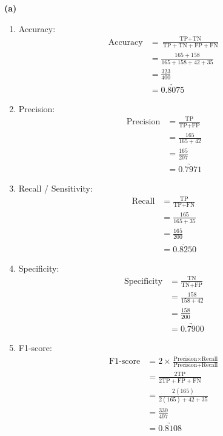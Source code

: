 \textbf{(a)}
\begin{enumerate}[label=\roman*., topsep=0pt, itemsep=2pt]
    \item Accuracy:
        \begin{align*}
        \text{Accuracy} &= \frac{\text{TP} + \text{TN}}{\text{TP} + \text{TN} + \text{FP} + \text{FN}} \\
                        &= \frac{165 + 158}{165 + 158 + 42 + 35} \\
                        &= \frac{323}{400} \\
                        &= \underrightarrow{0.8075}
        \end{align*}
    \item Precision:
        \begin{align*}
        \text{Precision} &= \frac{\text{TP}}{\text{TP} + \text{FP}} \\
                         &= \frac{165}{165 + 42} \\
                         &= \frac{165}{207} \\
                         &= \underrightarrow{0.7971}
        \end{align*}
    \item Recall / Sensitivity:
        \begin{align*}
        \text{Recall}   &= \frac{\text{TP}}{\text{TP} + \text{FN}} \\
                        &= \frac{165}{165 + 35} \\
                        &= \frac{165}{200} \\
                        &= \underrightarrow{0.8250}
        \end{align*}
    \item Specificity:
        \begin{align*}
        \text{Specificity}  &= \frac{\text{TN}}{\text{TN} + \text{FP}} \\
                            &= \frac{158}{158 + 42} \\
                            &= \frac{158}{200} \\
                            &= \underrightarrow{0.7900}
        \end{align*}
    \item F1-score:
        \begin{align*}
        \text{F1-score} &= 2 \times \frac{\text{Precision} \times \text{Recall}}{\text{Precision} + \text{Recall}} \\
                        &= \frac{2\text{TP}}{2\text{TP} + \text{FP} + \text{FN}} \\
                        &= \frac{2(\text{165})}{2(\text{165}) + \text{42} + \text{35}} \\
                        &= \frac{330}{407} \\
                        &= \underrightarrow{0.8108}
        \end{align*}
\end{enumerate}

